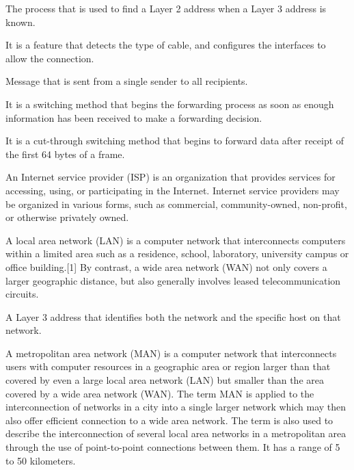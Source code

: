 \label{term_arp}

The process that is used to find a Layer 2 address when a Layer 3 address is known.

\label{term_mdix}

It is a feature that detects the type of cable, and configures the interfaces to allow the connection.

\label{term_broadcast}

Message that is sent from a single sender to all recipients.

\label{term_ct_switching}

It is a switching method that begins the forwarding process as soon as enough information has been received to make a forwarding decision.

\label{term_ff_switching}

It is a cut-through switching method that begins to forward data after receipt of the first 64 bytes of a frame.

\label{term_isp}

An Internet service provider (ISP) is an organization that provides services for accessing, using, or participating in the Internet. Internet service providers may be organized in various forms, such as commercial, community-owned, non-profit, or otherwise privately owned.

\label{term_lan}

A local area network (LAN) is a computer network that interconnects computers within a limited area such as a residence, school, laboratory, university campus or office building.[1] By contrast, a wide area network (WAN) not only covers a larger geographic distance, but also generally involves leased telecommunication circuits.

\label{term_logical_address}

A Layer 3 address that identifies both the network and the specific host on that network.

\label{term_man}

A metropolitan area network (MAN) is a computer network that interconnects users with computer resources in a geographic area or region larger than that covered by even a large local area network (LAN) but smaller than the area covered by a wide area network (WAN). The term MAN is applied to the interconnection of networks in a city into a single larger network which may then also offer efficient connection to a wide area network. The term is also used to describe the interconnection of several local area networks in a metropolitan area through the use of point-to-point connections between them. It has a range of 5 to 50 kilometers. 

